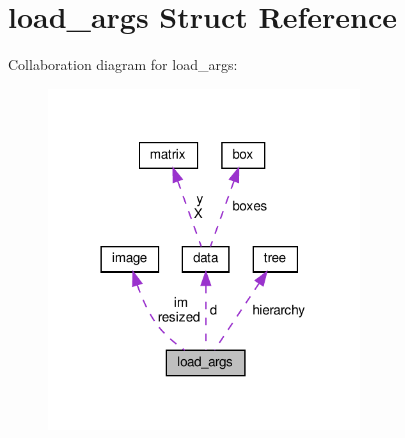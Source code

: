 \hypertarget{structload__args}{}\section{load\+\_\+args Struct Reference}
\label{structload__args}


Collaboration diagram for load\+\_\+args\+:
\nopagebreak
\begin{figure}[H]
\begin{center}
\leavevmode
\includegraphics[width=234pt]{structload__args__coll__graph}
\end{center}
\end{figure}
